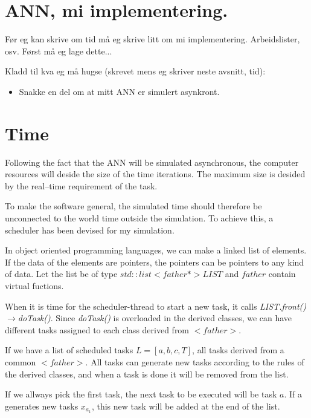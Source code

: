 \section{ANN, mi implementering.}

Før eg kan skrive om tid må eg skrive litt om mi implementering. Arbeidslister, osv. Først må eg lage dette...

Kladd til kva eg må hugse (skrevet mens eg skriver neste avsnitt, tid):
\begin{itemize}
	\item Snakke en del om at mitt ANN er simulert asynkront.
\end{itemize}



\section{Time}

Following the fact that the ANN will be simulated asynchronous, the computer resources will deside the size of the time iterations. The maximum size is desided by the real--time requirement of the task.

To make the software general, the simulated time should therefore be unconnected to the world time outside the simulation. To achieve this, a scheduler has been devised for my simulation.


In object oriented programming languages, we can make a linked list of elements. 
If the data of the elements are pointers, the pointers can be pointers to any kind of data. Let the list be of type \emph{$std::list<father*> LIST$} and \emph{$father$} contain virtual fuctions. 

When it is time for the scheduler-thread to start a new task, it calls \emph{LIST.front()$\rightarrow$doTask()}. 
Since \emph{doTask()} is overloaded in the derived classes, we can have different tasks assigned to each class derived from \emph{$<father>$}.




If we have a list of scheduled tasks $L = [a, b, c, T]$, all tasks derived from a common \emph{$<father>$}. 
All tasks can generate new tasks according to the rules of the derived classes, and when a task is done it will be removed from the list.

If we allways pick the first task, the next task to be executed will be task $a$. %
If a generates new tasks $x_{a_1}$, this new task will be added at the end of the list.

